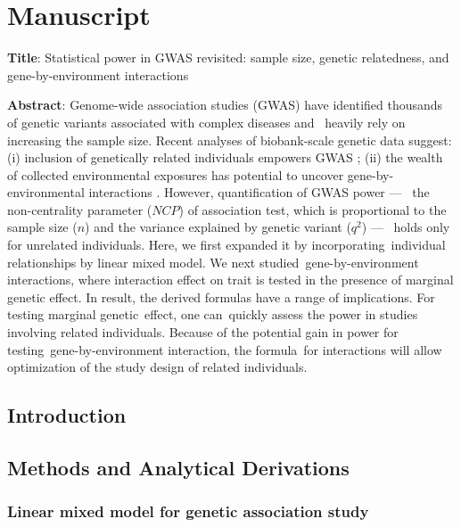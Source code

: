 \documentclass[]{book}
\date{}
\theoremstyle{definition}
\theoremstyle{definition}
\theoremstyle{definition}
\theoremstyle{remark}
\begin{document}
\setlength{\abovedisplayskip}{-5pt}
\setlength{\abovedisplayshortskip}{-5pt}

{
\setcounter{tocdepth}{2}
\tableofcontents
}
\chapter{Manuscript}\label{manuscript}

\textbf{Title}: Statistical power in GWAS revisited: sample size,
genetic relatedness, and gene-by-environment interactions

\textbf{Abstract}: Genome-wide association studies (GWAS) have
identified thousands of genetic variants associated with complex
diseases and~ heavily rely on increasing the sample size. Recent
analyses of biobank-scale genetic data suggest: (i) inclusion of
genetically related individuals empowers GWAS \citep{loh2018mixed}; (ii)
the wealth of collected environmental exposures has potential to uncover
gene-by-environmental interactions \citep{young2016multiple}. However,
quantification of GWAS power ---~ the non-centrality parameter (\(NCP\))
of association test, which is proportional to the sample size (\(n\))
and the variance explained by genetic variant (\(q^2\)) ---~ holds only
for unrelated individuals. Here, we first expanded it by
incorporating~individual relationships by linear mixed model. We next
studied~gene-by-environment interactions, where interaction effect on
trait is tested in the presence of marginal genetic effect. In result,
the derived formulas have a range of implications. For testing marginal
genetic~effect, one can~quickly assess the power in studies involving
related individuals. Because of the potential gain in power for
testing~gene-by-environment interaction, the formula~for interactions
will allow optimization of the study design of related individuals.

\section{Introduction}\label{introduction}

\section{Methods and Analytical
Derivations}\label{methods-and-analytical-derivations}

\subsection{Linear mixed model for genetic association
study}\label{linear-mixed-model-for-genetic-association-study}
\end{document}
